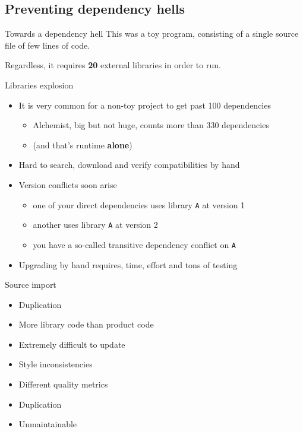 \documentclass[presentation]{beamer}
\begin{document}
\subsection{Preventing dependency hells}
\begin{frame}{Towards a dependency hell}
	This was a toy program, consisting of a single source file of few lines of code.

	Regardless, it requires \textbf{20} external libraries in order to run.
	
	\begin{block}{Libraries explosion}
		\begin{itemize}
			\item It is very common for a non-toy project to get past 100 dependencies
			\begin{itemize}
				\item Alchemist, big but not huge, counts more than 330 dependencies
				\item (and that's runtime \textbf{alone})
			\end{itemize}
			\item Hard to search, download and verify compatibilities by hand 
			\item Version conflicts soon arise
			\begin{itemize}
				\item one of your direct dependencies uses library \texttt{A} at version 1
				\item another uses library \texttt{A} at version 2
				\item you have a so-called transitive dependency conflict on \texttt{A}
			\end{itemize}
			\item Upgrading by hand requires, time, effort and tons of testing
		\end{itemize}
	\end{block}
	\begin{block}{Source import}
		\begin{itemize}
			\item Duplication
			\item More library code than product code
			\item Extremely difficult to update
			\item Style inconsistencies
			\item Different quality metrics
			\item Duplication
			\item Unmaintainable
		\end{itemize}

\end{block}
\end{frame}
\end{document}
